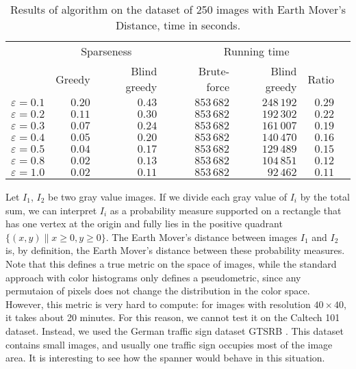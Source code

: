 \documentclass[]{ws-ijcga}
\renewcommand{\geq}{\geqslant}
\newcommand{\eps}{\varepsilon}
\begin{document}
\begin{table}\centering
    \begin{tabular}{@{}rrrcrrrc@{}}\toprule
        & \multicolumn{2}{c}{Sparseness} & \phantom{abc} & \multicolumn{3}{c}{Running time} \\
        \cmidrule{2-3} \cmidrule{5-7} 
                & Greedy  & Blind greedy && Brute-force & Blind greedy & Ratio \\ \midrule
$\eps = 0.1$    &   $0.20$  &  $0.43$    &&  $853\,682$   &  $248\,192$    & $0.29$   \\
$\eps = 0.2$    &   $0.11$  &  $0.30$    &&  $853\,682$   & $192\,302$    & $0.22$   \\
$\eps = 0.3$    &   $0.07$  &  $0.24$    &&  $853\,682$   & $161\,007$    & $0.19$   \\
$\eps = 0.4$    &   $0.05$  &  $0.20$    &&  $853\,682$   & $140\,470$    & $0.16$   \\
$\eps = 0.5$    &   $0.04$  &  $0.17$    &&  $853\,682$   & $129\,489$    & $0.15$   \\
$\eps = 0.8$    &   $0.02$  &  $0.13$    &&  $853\,682$   & $104\,851$    & $0.12$   \\
$\eps = 1.0$    &   $0.02$  &  $0.11$    &&  $853\,682$   & $92\,462$    & $0.11$   \\
\bottomrule
\end{tabular}
    \caption{Results of \bgrdy algorithm on the dataset of 250 images
    with Earth Mover's Distance, time in seconds.}
\label{tbl:emd_gtsrb}
\end{table}


Let $I_1$, $I_2$ be two gray value images.
If we divide each gray value of $I_{i}$
by the total sum, we can interpret $I_i$
as a probability measure supported on a rectangle
that has one vertex at the origin and
fully lies in the positive quadrant $\{ (x, y) \| x \geq 0, y \geq 0 \}$.
The Earth Mover's distance between images $I_1$ and $I_2$
is, by definition, the Earth Mover's distance between
these probability measures.
Note that this defines a true metric on the space of images,
while the standard approach with color histograms only defines
a pseudometric, since any permutaion of pixels does not
change the distribution in the color space.
However, this metric is very hard to compute:
for images with resolution $40\times 40$,
it takes about 20 minutes. For this reason,
we cannot test it on the Caltech 101 dataset.
Instead, we used the German traffic sign
dataset GTSRB \cite{gtsrb}. This
dataset contains small images, and usually
one traffic sign occupies most of the image area.
It is interesting to see how
the \bgrdy spanner would behave in this situation.
\end{document}
